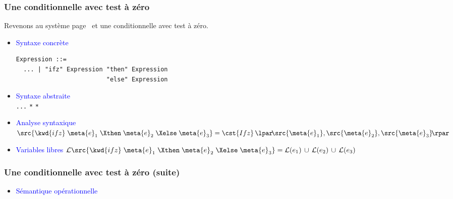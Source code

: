 %
\begin{frame}[containsverbatim]
\frametitle{Une conditionnelle avec test à zéro}

Revenons au système
page~\pageref{semantique_operationnelle_etendue_lisible} et une
conditionnelle avec test à zéro.

\begin{itemize}

  \item \textcolor{blue}{Syntaxe concrète}
  {\small
   \begin{verbatim}
Expression ::=
  ... | "ifz" Expression "then" Expression
                         "else" Expression
   \end{verbatim}
}
  \vspace*{-12pt}

  \item \textcolor{blue}{Syntaxe abstraite}\\
  \Xtype {} \equal \texttt{...} \vbar {}
  \Xof {} \texttt{*}  \texttt{*} \semi

  \item \textcolor{blue}{Analyse syntaxique} \quad $\src{\kwd{ifz} \;
     \meta{e}_1 \; \Xthen \; \meta{e}_2 \; \Xelse \;
     \meta{e}_3} = \cst{Ifz} \, \lpar\!\src{\meta{e}_1},
     \src{\meta{e}_2}, \src{\meta{e}_3}\!\rpar$

 \item \textcolor{blue}{Variables libres} \quad ${\cal L} \src{\kwd{ifz} \;
     \meta{e}_1 \; \Xthen \; \meta{e}_2 \; \Xelse \;
     \meta{e}_3} = {\cal L} (e_1) \, \cup \, {\cal L} (e_2) \, \cup \,
     {\cal L} (e_3)$

\end{itemize}

\end{frame}

%
\begin{frame}[containsverbatim]
\frametitle{Une conditionnelle avec test à zéro (suite)}

\begin{itemize}

  \item \textcolor{blue}{Sémantique opérationnelle}

\end{itemize}

\end{frame}

